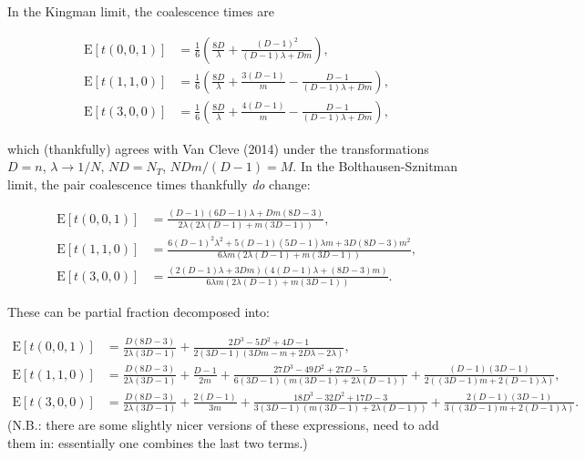\documentclass[rmp]{revtex4}
\begin{document}
In the Kingman limit, the coalescence times are

\begin{align}
\mathrm{E} \left[ t(0,0,1) \right] &= \frac{1}{6}\left( \frac{8D}{\lambda} + \frac{(D-1)^2}{(D-1)\lambda+Dm} \right),\\
\mathrm{E} \left[ t(1,1,0) \right] &= \frac{1}{6} \left( \frac{8D}{\lambda} + \frac{3(D-1)}{m} - \frac{D-1}{(D-1)\lambda+Dm} \right), \\
\mathrm{E} \left[ t(3,0,0) \right] &= \frac{1}{6}\left( \frac{8D}{\lambda} + \frac{4(D-1)}{m} - \frac{D-1}{(D-1)\lambda+Dm} \right),
\end{align}

which (thankfully) agrees with Van Cleve (2014) under the transformations $D = n$, $\lambda \to 1/N$, $ND = N_T$, $NDm/(D-1) = M$. In the Bolthausen-Sznitman limit, the pair coalescence times thankfully \emph{do} change:

\begin{align}
\mathrm{E} \left[ t(0,0,1) \right] &= \frac{(D-1)(6D-1)\lambda + Dm(8D-3)}{2\lambda(2\lambda(D-1) + m(3D-1))},\\
\mathrm{E} \left[ t(1,1,0) \right] &= \frac{6(D-1)^2\lambda^2 + 5(D-1)(5D-1)\lambda m + 3D(8D-3)m^2}{6\lambda m(2\lambda(D-1) + m(3D-1))},\\
\mathrm{E} \left[ t(3,0,0) \right] &=  \frac{(2(D-1)\lambda + 3Dm)(4(D-1)\lambda + (8D-3)m)}{6\lambda m(2\lambda(D-1) + m(3D-1))}.
\end{align}

These can be partial fraction decomposed into:

\begin{align}
\mathrm{E} \left[ t(0,0,1) \right] &= \frac{D(8D-3)}{2\lambda(3D-1)} + \frac{2D^3-5D^2+4D-1}{2(3D-1)(3Dm-m+2D\lambda - 2\lambda)},\\
\mathrm{E} \left[ t(1,1,0) \right] &= \frac{D(8D-3)}{2\lambda(3D-1)} + \frac{D-1}{2m} + \frac{27D^3-49D^2+27D-5}{6(3D-1)(m(3D-1)+2\lambda(D-1))} + \frac{(D-1)(3D-1)}{2((3D-1)m+2(D-1)\lambda)},\\
\mathrm{E} \left[ t(3,0,0) \right] &= \frac{D(8D-3)}{2\lambda(3D-1)} + \frac{2(D-1)}{3m} + \frac{18D^3-32D^2+17D-3}{3(3D-1)(m(3D-1)+2\lambda(D-1))} + \frac{2(D-1)(3D-1)}{3((3D-1)m+2(D-1)\lambda)}.
\end{align}
(N.B.: there are some slightly nicer versions of these expressions, need to add them in: essentially one combines the last two terms.)
\end{document}
